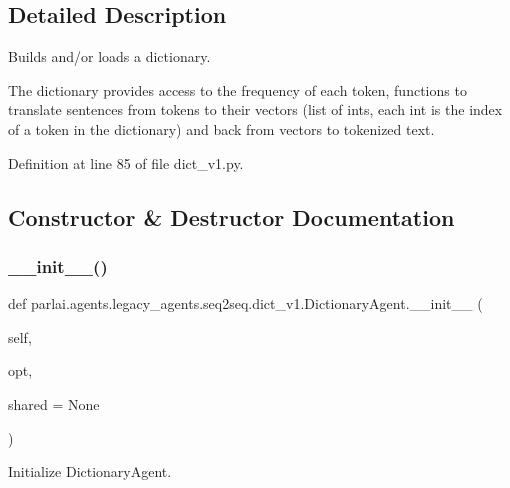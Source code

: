 \subsection{Detailed Description}
\begin{DoxyVerb}Builds and/or loads a dictionary.

The dictionary provides access to the frequency of each token, functions
to translate sentences from tokens to their vectors (list of ints, each
int is the index of a token in the dictionary) and back from vectors to
tokenized text.
\end{DoxyVerb}
 

Definition at line 85 of file dict\+\_\+v1.\+py.



\subsection{Constructor \& Destructor Documentation}
\mbox{\label{classparlai_1_1agents_1_1legacy__agents_1_1seq2seq_1_1dict__v1_1_1DictionaryAgent_ae3eb915e40f2b8dc1788d2fa9d59697c}} 
\subsubsection{\texorpdfstring{\+\_\+\+\_\+init\+\_\+\+\_\+()}{\_\_init\_\_()}}
{\footnotesize\ttfamily def parlai.\+agents.\+legacy\+\_\+agents.\+seq2seq.\+dict\+\_\+v1.\+Dictionary\+Agent.\+\_\+\+\_\+init\+\_\+\+\_\+ (\begin{DoxyParamCaption}\item[{}]{self,  }\item[{}]{opt,  }\item[{}]{shared = {\ttfamily None} }\end{DoxyParamCaption})}

\begin{DoxyVerb}Initialize DictionaryAgent.\end{DoxyVerb}
 


